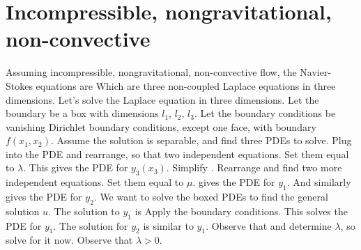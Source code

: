 \documentclass{article}
\begin{document}
\section{Incompressible, nongravitational, non-convective}
Assuming incompressible, nongravitational, non-convective flow, the Navier-Stokes equations are
Which are three non-coupled Laplace equations in three dimensions. Let's solve the Laplace equation in three dimensions.
Let the boundary be a box with dimensions $l_1$, $l_2$, $l_3$.
Let the boundary conditions be vanishing Dirichlet boundary conditions, except one face, with boundary $f(x_1,x_2)$.
Assume the solution is separable, and find three PDEs to solve.
Plug into the PDE and rearrange, so that two independent equations. Set them equal to $\lambda$.
This gives the PDE for $y_3(x_3)$.
Simplify .
Rearrange and find two more independent equations. Set them equal to $\mu$.
 gives the PDE for $y_1$.
And similarly  gives the PDE for $y_2$.
We want to solve the boxed PDEs to find the general solution $u$. The solution to $y_1$ is
Apply the boundary conditions.
This solves the PDE for $y_1$. The solution for $y_2$ is similar to $y_1$.
Observe that  and  determine $\lambda$, so solve for it now. Observe that $\lambda>0$.
\end{document}
